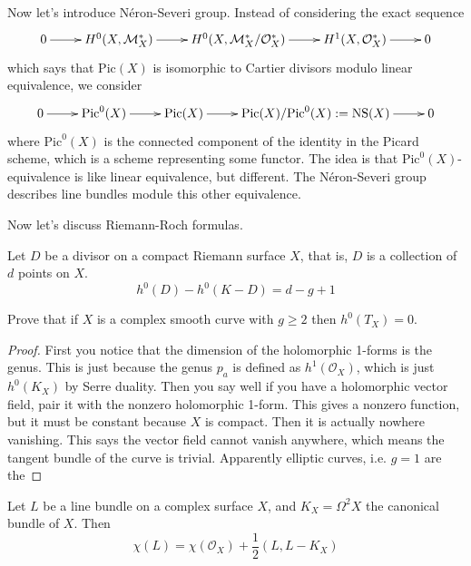 \medskip\noindent
Now let's introduce Néron-Severi group.
Instead of considering the exact sequence 
$$
\xymatrix{
0\ar[r]
&H^0(X,\mathcal{M}^*_X)\ar[r]
&H^0(X,\mathcal{M}_X^*/\mathcal{O}_X^*)\ar[r]
&H^1(X,\mathcal{O}_X^*)\ar[r]
&0
}
$$
which says that $\text{Pic}(X)$ is isomorphic
to Cartier divisors modulo linear equivalence,
we consider
$$
\xymatrix{
0\ar[r]
&\text{Pic}^0(X)\ar[r]
&\text{Pic}(X)\ar[r]
&\text{Pic}(X)/\text{Pic}^0(X):=\text{NS}(X)\ar[r]
&0
}
$$
where $\text{Pic}^0(X)$ is the connected component
of the identity in the Picard scheme,
which is a scheme representing some functor.
The idea is that $\text{Pic}^0(X)$-equivalence
is like linear equivalence, but different.
The Néron-Severi group describes line bundles
module this other equivalence.



\medskip\noindent
Now let's discuss Riemann-Roch formulas.

\begin{theorem}
\label{theorem-Riemann-Roch-for-curves}
Let $D$ be a divisor on a compact Riemann surface $X$, that is, $D$ is a
collection of $d$ points on $X$.
\begin{equation}
\label{equation-Riemann-Roch-for-Riemann-surfaces}
h^0(D)-h^0(K-D)=d-g+1
\end{equation}
\end{theorem}

\begin{exercise}
\label{exercise-no-holomorphic-vector-fields-for-g-geq2}
Prove that if $X$ is a complex smooth curve with $g\geq 2$ then $h^0(T_X)=0$.
\end{exercise}

\begin{proof}
First you notice that the dimension of the holomorphic 1-forms is the genus.
This is just because the genus $p_a$ is defined as $h^1(\mathcal{O}_X)$, which
is just $h^0(K_X)$ by Serre duality. Then you say well if you have a holomorphic
vector field, pair it with the nonzero holomorphic 1-form. This gives a nonzero
function, but it must be constant because $X$ is compact. Then it is actually
nowhere vanishing. This says the vector field cannot vanish anywhere, which
means the tangent bundle of the curve is trivial. Apparently elliptic curves,
i.e. $g=1$ are the 
\end{proof}

\begin{theorem}
\label{theorem-Riemann-Roch-for-line-bundles-on-surfaces}
Let $L$ be a line bundle on a complex surface $X$, and $K_X=\Omega^2X$ the
canonical bundle of $X$. Then
\begin{equation}
\label{equation-Riemann-Roch-for-line-bundles-on-surfaces}
\chi(L)=\chi(\mathcal{O}_X)+\frac{1}{2}(L,L-K_X)
\end{equation}
\end{theorem}

